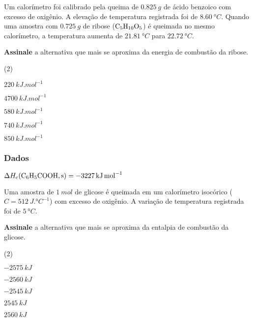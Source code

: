 \documentclass[braun, twocolumn]{braun}
\begin{document}
\begin{problem}
[2A24]Um calorímetro foi calibrado pela queima de \(\qty{0,825}{g}\) de ácido
benzoico com excesso de oxigênio. A elevação de temperatura registrada
foi de \(\qty{8,60}{\degree C}\). Quando uma amostra com \(\qty{0,725}{g}\)
de ribose (\(\ce{C5H10O5}\)) é queimada no mesmo calorímetro, a
temperatura aumenta de \(\qty{21,81}{\degree C}\) para
\(\qty{22,72}{\degree C}\).

\textbf{Assinale} a alternativa que mais se aproxima da energia de
combustão da ribose.


\begin{choices}
(2)
\item \(\qty{220}{kJ.mol^{-1}}\)

\item \(\qty{4700}{kJ.mol^{-1}}\)

\item \(\qty{580}{kJ.mol^{-1}}\)

\item \(\qty{740}{kJ.mol^{-1}}\)

\item \(\qty{850}{kJ.mol^{-1}}\)

\end{choices}
\subsubsection*{Dados}


\begin{datalist}

\item $\Delta H_\text{c}(\ce{C6H5COOH, {s}}) = \qty{-3227}{kJ.mol^{-1}}$
\end{datalist}

\end{problem}



\begin{problem}
[2A25]Uma amostra de \(\qty{1}{mol}\) de glicose é queimada em um calorímetro
isocórico (\(C = \qty{512}{J.\degree C^{-1}}\)) com excesso de oxigênio. A
variação de temperatura registrada foi de \(\qty{5}{\degree C}\).

\textbf{Assinale} a alternativa que mais se aproxima da entalpia de
combustão da glicose.


\begin{choices}
(2)
\item \(\qty{-2575}{kJ}\)

\item \(\qty{-2560}{kJ}\)

\item \(\qty{-2545}{kJ}\)

\item \(\qty{2545}{kJ}\)

\item \(\qty{2560}{kJ}\)

\end{choices}

\end{problem}
\end{document}
